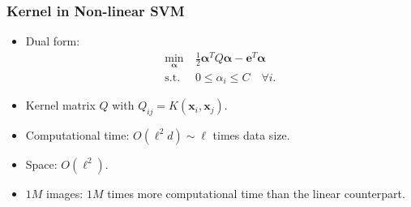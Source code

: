 \documentclass{beamer}
\def\balpha{{\boldsymbol \alpha}}
\def\be{{\boldsymbol e}}
\def\bx{{\boldsymbol x}}
\begin{document}
\begin{frame}
  \frametitle{Kernel in Non-linear SVM}
  \begin{itemize}
    \item Dual form:
    \begin{align}
    \label{eq:svmdual} \nonumber
    \min_{\balpha} \  &  \frac{1}{2} \balpha^T Q  \balpha - \be^T \balpha \nonumber \\
    \mbox{s.t.} \  & 0 \le \alpha_i \le C \quad \forall i \mbox{.} \nonumber
    \end{align}
    \item Kernel matrix $Q$ with $Q_{ij} = K(\bx_i, \bx_j)$.
    \pause
    \item [] Computational time: $O(\ell^2 d) \sim \ell$ times data size.
    \item [] Space: $O(\ell^2)$.
    \pause
    \item $1M$ images: $1M$ times more computational time than the linear counterpart.
  \end{itemize}
\end{frame}
\end{document}
